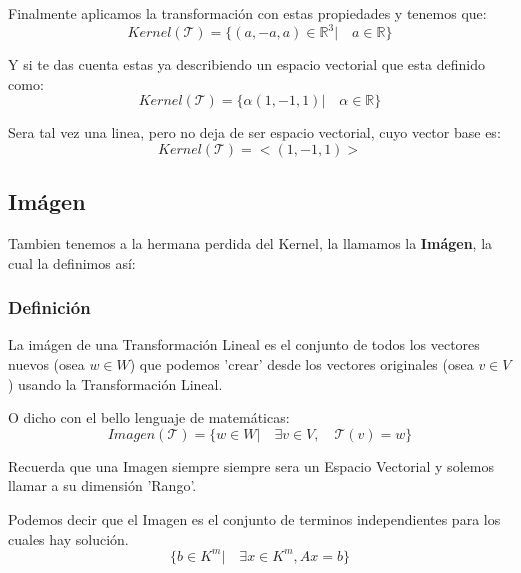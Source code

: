 \documentclass[12pt]{report}                                %
\begin{document}
            Finalmente aplicamos la transformación con estas propiedades y tenemos que:
            \begin{equation*}
                Kernel(\mathscr{T}) = \{(a,-a,a)\in \mathbb{R}^3 |\quad a \in \mathbb{R}\}
            \end{equation*}

            Y si te das cuenta estas ya describiendo un espacio vectorial que esta definido como:
            \begin{equation*}
                Kernel(\mathscr{T}) = \{\alpha(1,-1,1) |\quad \alpha\in \mathbb{R}\}
            \end{equation*}

            Sera tal vez una linea, pero no deja de ser espacio vectorial, cuyo vector base es:
            \begin{equation*}
                Kernel(\mathscr{T}) = <(1,-1,1)>
            \end{equation*}




        \clearpage
        \subsection{Imágen}
        Tambien tenemos a la hermana perdida del Kernel, la llamamos la \textbf{Imágen},
        la cual la definimos así:

        \subsubsection{Definición}
        La imágen de una Transformación Lineal es el conjunto de todos los vectores
        nuevos (osea $w \in W$) que podemos 'crear' desde los vectores originales
        (osea $v \in V$) usando la Transformación Lineal.

        O dicho con el bello lenguaje de matemáticas:
        \begin{equation}
            Imagen(\mathscr{T}) = \{w \in W |\quad \exists v \in V ,\quad \mathscr{T}(v) = w\}
        \end{equation}

        Recuerda que una Imagen siempre siempre sera un Espacio Vectorial y solemos
        llamar a su dimensión 'Rango'.

        Podemos decir que el Imagen es el conjunto de terminos independientes para los cuales
        hay solución.
        \begin{equation*}
            \{b \in K^m |\quad \exists x \in K^m, Ax = b \}
        \end{equation*}
\end{document}
